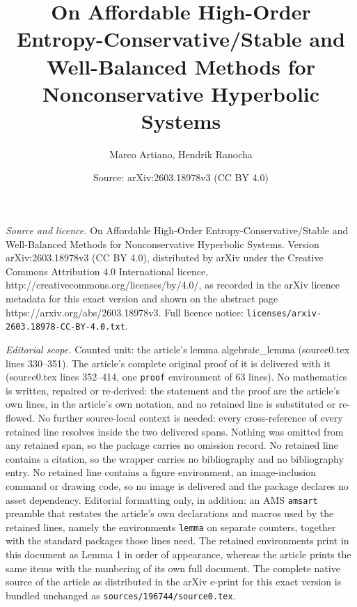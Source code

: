 \documentclass[10pt,a4paper]{amsart}
\title{On Affordable High-Order Entropy-Conservative/Stable and Well-Balanced Methods for Nonconservative Hyperbolic Systems}
\author{Marco Artiano, Hendrik Ranocha}
\date{Source: arXiv:2603.18978v3 (CC BY 4.0)}
\begin{document}
\maketitle

\noindent\emph{Source and licence.} On Affordable High-Order Entropy-Conservative/Stable and Well-Balanced Methods for Nonconservative Hyperbolic Systems. Version arXiv:2603.18978v3 (CC BY 4.0), distributed by arXiv under the Creative Commons Attribution 4.0 International licence, http://creativecommons.org/licenses/by/4.0/, as recorded in the arXiv licence metadata for this exact version and shown on the abstract page https://arxiv.org/abs/2603.18978v3. Full licence notice: \texttt{licenses/arxiv-2603.18978-CC-BY-4.0.txt}.\par\smallskip

\noindent\textit{Editorial scope.} Counted unit: the article's lemma algebraic\_lemma (source0.tex lines 330--351). The article's complete original proof of it is delivered with it (source0.tex lines 352--414, one \texttt{proof} environment of 63 lines). No mathematics is written, repaired or re-derived: the statement and the proof are the article's own lines, in the article's own notation, and no retained line is substituted or re-flowed.  No further source-local context is needed: every cross-reference of every retained line resolves inside the two delivered spans.  Nothing was omitted from any retained span, so the package carries no omission record.  No retained line contains a citation, so the wrapper carries no bibliography and no bibliography entry.  No retained line contains a figure environment, an image-inclusion command or drawing code, so no image is delivered and the package declares no asset dependency.  Editorial formatting only, in addition: an AMS \texttt{amsart} preamble that restates the article's own declarations and macros used by the retained lines, namely the environments \texttt{lemma} on separate counters, together with the standard packages those lines need.  The retained environments print in this document as Lemma 1 in order of appearance, whereas the article prints the same items with the numbering of its own full document.  The complete native source of the article as distributed in the arXiv e-print for this exact version is bundled unchanged as \texttt{sources/196744/source0.tex}.
\end{document}
